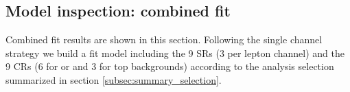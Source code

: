 \clearpage
\subsection{Model inspection: combined fit}
\label{sec:fit_combo}



Combined fit results are shown in this section.
Following the single channel strategy we build a fit model including the 9 SRs (3 per lepton channel)
and the 9 CRs (6 for \Zjets or \Wjets and 3 for top backgrounds) 
according to the analysis selection summarized in section \ref{subsec:summary_selection}.






